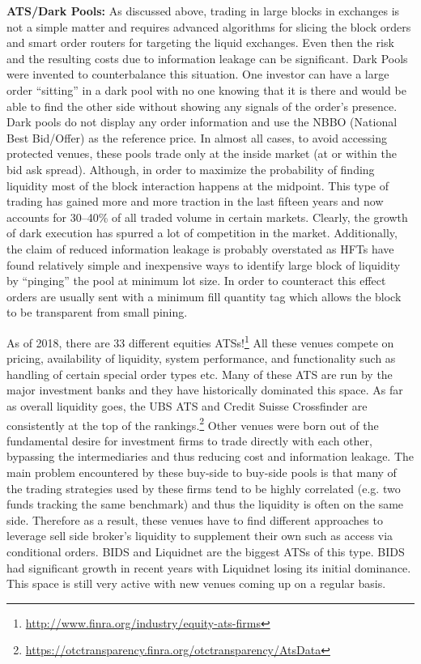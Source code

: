 \noindent\textbf{ATS/Dark Pools:} As discussed above, trading in large blocks in exchanges is not a simple matter and requires advanced algorithms for slicing the block orders and smart order routers for targeting the liquid exchanges. Even then the risk and the resulting costs due to information leakage can be significant. Dark Pools were invented to counterbalance this situation. One investor can have a large order ``sitting'' in a dark pool with no one knowing that it is there and would be able to find the other side without showing any signals of the order's presence. Dark pools do not display any order information and use the NBBO (National Best Bid/Offer) as the reference price. In almost all cases, to avoid accessing protected venues, these pools trade only at the inside market (at or within the bid ask spread). Although, in order to maximize the probability of finding liquidity most of the block interaction happens at the midpoint. This type of trading has gained more and more traction in the last fifteen years and now accounts for 30--40\% of all traded volume in certain markets. Clearly, the growth of dark execution has spurred a lot of competition in the market. Additionally, the claim of reduced information leakage is probably overstated as HFTs have found relatively simple and inexpensive ways to identify large block of liquidity by ``pinging'' the pool at minimum lot size. In order to counteract this effect orders are usually sent with a minimum fill quantity tag which allows the block to be transparent from small pining.


As of 2018, there are 33 different equities ATSs!\footnote{\url{http://www.finra.org/industry/equity-ats-firms}} All these venues compete on pricing, availability of liquidity, system performance, and functionality such as handling of certain special order types etc. Many of these ATS are run by the major investment banks and they have historically dominated this space. As far as overall liquidity goes, the UBS ATS and Credit Suisse Crossfinder are consistently at the top of the rankings.\footnote{\url{https://otctransparency.finra.org/otctransparency/AtsData}} Other venues were born out of the fundamental desire for investment firms to trade directly with each other, bypassing the intermediaries and thus reducing cost and information leakage.  The main problem encountered by these buy-side to buy-side pools is that many of the trading strategies used by these firms tend to be highly correlated (e.g. two funds tracking the same benchmark) and thus the liquidity is often on the same side. Therefore as a result, these venues have to find different approaches to leverage sell side broker's liquidity to supplement their own such as access via conditional orders. BIDS and Liquidnet are the biggest ATSs of this type. BIDS had significant growth in recent years with Liquidnet losing its initial dominance. This space is still very active with new venues coming up on a regular basis. \twomedskip


